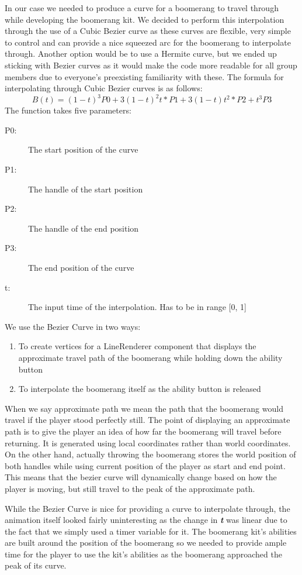 In our case we needed to produce a curve for a boomerang to travel through while developing the boomerang kit. We decided to perform this interpolation through the use of a Cubic Bezier curve as these curves are flexible, very simple to control and can provide a nice squeezed arc for the boomerang to interpolate through. Another option would be to use a Hermite curve, but we ended up sticking with Bezier curves as it would make the code more readable for all group members due to everyone's preexisting familiarity with these. The formula for interpolating through Cubic Bezier curves is as follows:  
$$
B(t) = (1 - t)^3 P0 + 3(1 - t)^2 t * P1 + 3(1 - t)t^2 * P2 + t^3 P3 
$$
The function takes five parameters:
\begin{description}
    \item[P0:] The start position of the curve
    \item[P1:] The handle of the start position
    \item[P2:] The handle of the end position
    \item[P3:] The end position of the curve
    \item[t:]  The input time of the interpolation. Has to be in range [0, 1]
\end{description}

We use the Bezier Curve in two ways:
\begin{enumerate}
    \item To create vertices for a LineRenderer component that displays the approximate travel path of the boomerang while holding down the ability button
    \item To interpolate the boomerang itself as the ability button is released
\end{enumerate}
When we say approximate path we mean the path that the boomerang would travel if the player stood perfectly still.
The point of displaying an approximate path is to give the player an idea of how far the boomerang will travel before returning. It is generated using local coordinates rather than world coordinates. On the other hand, actually throwing the boomerang stores the world position of both handles while using current position of the player as start and end point. This means that the bezier curve will dynamically change based on how the player is moving, but still travel to the peak of the approximate path.  

While the Bezier Curve is nice for providing a curve to interpolate through, the animation itself looked fairly uninteresting as the change in \textbf{\textit{t}} was linear due to the fact that we simply used a timer variable for it. The boomerang kit's abilities are built around the position of the boomerang so we needed to provide ample time for the player to use the kit's abilities as the boomerang approached the peak of its curve. 

